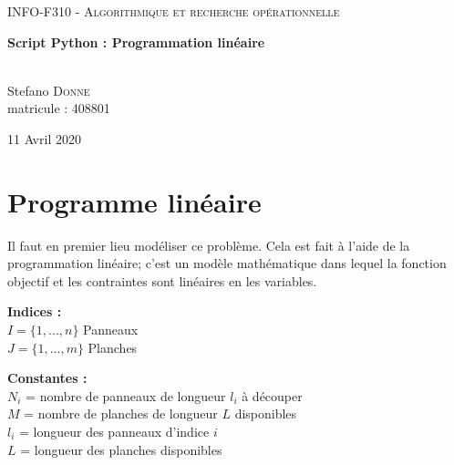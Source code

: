 \documentclass[12pt, openany]{report}
\begin{document}
\linespread{1.25}
  \begin{sffamily}
  \begin{center}
    
	\textsc{\Large INFO-F310 - Algorithmique et recherche opérationnelle}\\[1.0cm]
    \vspace{100pt}
  
    { \huge \bfseries Script Python : Programmation linéaire\\[0.4cm] }

	\centering
	\vspace{330pt}
    \begin{minipage}{0.4\textwidth}
      \begin{flushleft} \large
      \textit{}\\
        
        Stefano \textsc{Donne}\\
        matricule : 408801
        
      
      \end{flushleft}
    \end{minipage}
    \begin{minipage}{0.4\textwidth}
      \begin{flushright} \large
     
      \end{flushright}
    \end{minipage}

    \vfill

    {\large 11 Avril 2020}

  \end{center}
  \end{sffamily}

\newpage

\chapter{Programme linéaire}
\noindent
Il faut en premier lieu modéliser ce problème. Cela est fait à l'aide de la programmation linéaire; c'est un modèle mathématique dans lequel la fonction objectif et les contraintes sont linéaires en les variables.

\textbf{Indices :}\\
$I = \{1,...,n\}$ Panneaux \\
$J = \{1,...,m\}$ Planches

\textbf{Constantes :}\\
$N_{i}$ = nombre de panneaux de longueur $l_{i}$ à découper\\
$M$ = nombre de planches de longueur $L$ disponibles\\
$l_{i}$ = longueur des panneaux d'indice $i$\\
$L$ = longueur des planches disponibles
\end{document}

